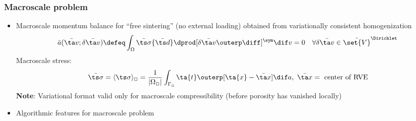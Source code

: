 \documentclass[11pt]{beamer} %
\DeclarePairedDelimiter{\homogenized}{\langle}{\rangle}
\begin{document}
\begin{frame}
 \frametitle{Macroscale problem}
 \begin{itemize}

    \item Macroscale momentum balance for ``free sintering'' (no external loading) obtained from variationally consistent homogenization
    \vspace{-1em}
    \begin{align*}
    \bar{a}(\bar{\ta v}; \delta \bar{\ta v}) \defeq
    \int_{\Omega} \bar{\ts \sigma}\{\bar{\ts d}\} \dprod [\delta\bar{\ta v}\outerp\diff]^\sym
    \dif v = 0 \quad \forall\delta\bar{\ta v} \in \bar{\set{V}}^\Dirichlet
    \end{align*}
    Macroscale stress:
    \vspace{-2.5truemm}
    \begin{align*}
    \bar{\ts\sigma} = \homogenized{\ts\sigma}_\Box =\frac{1}{|\Omega_{\Box}|}\int_{\Gamma_{\Box}}
    \ta{t}\outerp[\ta{x}-\bar{\ta x}] \dif a, \,\,\bar{\ta x}= \mbox{ center of RVE}
    \end{align*}
    \textbf{Note}: Variational format valid only for macroscale compressibility (before porosity has vanished locally)

    \item Algorithmic features for macroscale problem
 \end{itemize}
\end{frame}
\end{document}
